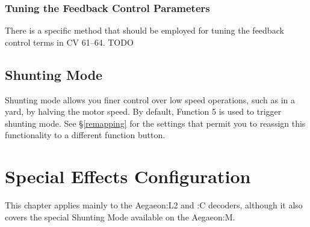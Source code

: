 \documentclass[12pt,letterpaper,draft]{memoir} %
\begin{document}
\subsection{Tuning the Feedback Control Parameters}

There is a specific method that should be employed for tuning the feedback control terms in CV 61--64. TODO

\section{Shunting Mode}
\label{ShuntingMode}

Shunting mode allows you finer control over low speed operations, such as in a yard, by halving the motor speed. By default, Function 5 is used to trigger shunting mode. See \S\ref{remapping} for the settings that permit you to reassign this functionality to a different function button.


\chapter{Special Effects Configuration}
\label{specialeffectsconfiguration}
This chapter applies mainly to the Aegaeon:L2 and :C decoders, although it also covers the special Shunting Mode available on the Aegaeon:M.
\end{document}
